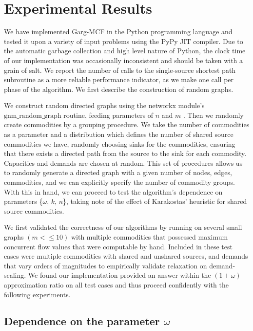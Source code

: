 \section{Experimental Results}

We have implemented Garg-MCF in the Python programming language and tested it upon a variety of input problems using the
PyPy JIT compiler. Due to the automatic garbage collection and high level nature of Python, the clock time of our
implementation was occasionally inconsistent and should be taken with a grain of salt. We report the number of calls to
the single-source shortest path subroutine as a more reliable performance indicator, as we make one call per phase of
the algorithm. We first describe the construction of random graphs.

We construct random directed graphs using the networkx module's $\mathrm{gnm\_random\_graph}$ routine, feeding
parameters of $n$ and $m$ \cite{networkx}. Then we randomly create commodities by a grouping procedure. We take the
number of commodities as a parameter and a distribution which defines the number of shared source commodities we have,
randomly choosing sinks for the commodities, ensuring that there exists a directed path from the source to the sink for
each commodity. Capacities and demands are chosen at random. This set of procedures allows us to randomly generate a
directed graph with a given number of nodes, edges, commodities, and we can explicitly specify the number of commodity
groups. With this in hand, we can proceed to test the algorithm's dependence on parameters \{$\omega$, $k$, $n$\},
taking note of the effect of Karakostas' heuristic for shared source commodities.

We first validated the correctness of our algorithms by running on
several small graphs $(m<\leq 10)$ with multiple commodities that
possessed maximum concurrent flow values that were computable by
hand. Included in these test cases were multiple commodities with
shared and unshared sources, and demands that vary orders of
magnitudes to empirically validate relaxation on demand-scaling. We
found our implementation provided an answer within the $(1+\omega)$
approximation ratio on all test cases and thus proceed confidently
with the following experiments.

\subsection{Dependence on the parameter $\omega$}

